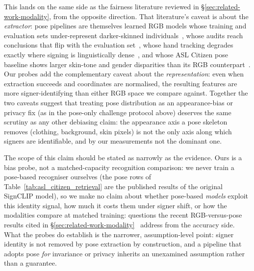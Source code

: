 This lands on the same side as the fairness literature reviewed in
\S\ref{sec:related-work-modality}, from the opposite direction. That literature's caveat is about
the \emph{extractor}: pose pipelines are themselves learned RGB models
whose training and evaluation sets under-represent darker-skinned
individuals~\cite{lachanceCaseStudyFairness2023,
hasanHi5SyntheticData2024}, %
whose audits reach conclusions that flip with the evaluation
set~\cite{lachanceCaseStudyFairness2023,
xiangFairHumanCentricImage2025}, %
whose hand tracking degrades exactly where signing is linguistically
dense~\cite{moryossefOptimizingHandRegion2024,
moryossefEvaluatingImmediateApplicability2021}, %
and whose ASL Citizen pose baseline shows larger skin-tone and gender
disparities than its RGB
counterpart~\cite{atwellStudyingMitigatingBiases2024}. %
Our probes add the complementary caveat about the \emph{representation}:
even when extraction succeeds and coordinates are normalised, the
resulting features are more signer-identifying than either RGB space we
compare against. Together the two caveats suggest that treating pose
distribution as an appearance-bias or privacy fix (as in the
pose-only challenge protocol above) deserves the same scrutiny as
any other debiasing claim: the appearance axis a pose skeleton removes
(clothing, background, skin pixels) is not the only axis along which
signers are identifiable, and by our measurements not the dominant one.

The scope of this claim should be stated as narrowly as the evidence.
Ours is a bias probe, not a matched-capacity recognition comparison: we
never train a pose-based recogniser ourselves (the pose rows of
Table~\ref{tab:asl_citizen_retrieval} are the published results of the
original SignCLIP model), %
so we make no claim about whether pose-based \emph{models} exploit this
identity signal, how much it costs them under signer shift, or how the
modalities compare at matched training: questions the recent
RGB-versus-pose results
cited in \S\ref{sec:related-work-modality}~\cite{minCloserLookSkeletonbased2025,
wongSignRepEnhancingSelfSupervised2025} %
address from the accuracy side. 
What the probes do establish is the narrower, assumption-level point:
signer identity is not removed by pose extraction by construction, and
a pipeline that adopts pose \emph{for} invariance or privacy inherits
an unexamined assumption rather than a guarantee.

